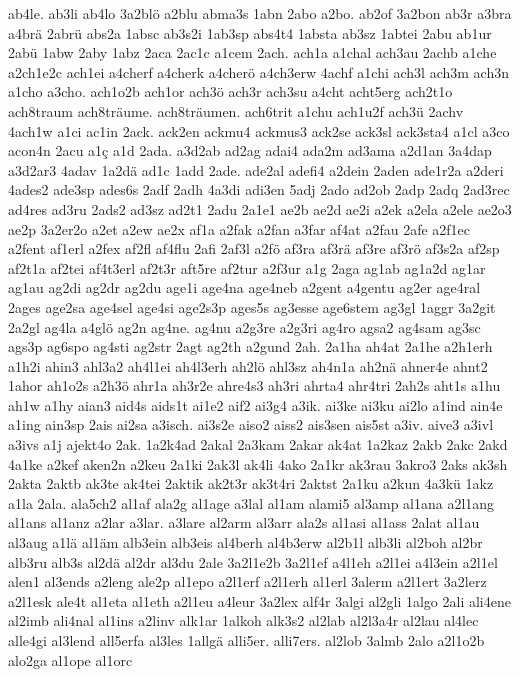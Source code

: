 {ab4le.
ab3li
ab4lo
3a2blö
a2blu
abma3s
1abn
2abo
a2bo.
ab2of
3a2bon
ab3r
a3bra
a4brä
2abrü
abs2a
1absc
ab3s2i
1ab3sp
abs4t4
1absta
ab3sz
1abtei
2abu
ab1ur
2abü
1abw
2aby
1abz
2aca
2ac1c
a1cem
2ach.
ach1a
a1chal
ach3au
2achb
a1che
a2ch1e2c
ach1ei
a4cherf
a4cherk
a4cherö
a4ch3erw
4achf
a1chi
ach3l
ach3m
ach3n
a1cho
a3cho.
ach1o2b
ach1or
ach3ö
ach3r
ach3su
a4cht
acht5erg
ach2t1o
ach8traum
ach8träume.
ach8träumen.
ach6trit
a1chu
ach1u2f
ach3ü
2achv
4ach1w
a1ci
ac1in
2ack.
ack2en
ackmu4
ackmus3
ack2se
ack3sl
ack3sta4
a1cl
a3co
acon4n
2acu
a1ç
a1d
2ada.
a3d2ab
ad2ag
adai4
ada2m
ad3ama
a2d1an
3a4dap
a3d2ar3
4adav
1a2dä
ad1c
1add
2ade.
ade2al
adefi4
a2dein
2aden
ade1r2a
a2deri
4ades2
ade3sp
ades6s
2adf
2adh
4a3di
adi3en
5adj
2ado
ad2ob
2adp
2adq
2ad3rec
ad4res
ad3ru
2ads2
ad3sz
ad2t1
2adu
2a1e1
ae2b
ae2d
ae2i
a2ek
a2ela
a2ele
ae2o3
ae2p
3a2er2o
a2et
a2ew
ae2x
af1a
a2fak
a2fan
a3far
af4at
a2fau
2afe
a2f1ec
a2fent
af1erl
a2fex
af2fl
af4flu
2afi
2af3l
a2fö
af3ra
af3rä
af3re
af3rö
af3s2a
af2sp
af2t1a
af2tei
af4t3erl
af2t3r
aft5re
af2tur
a2f3ur
a1g
2aga
ag1ab
ag1a2d
ag1ar
ag1au
ag2di
ag2dr
ag2du
age1i
age4na
age4neb
a2gent
a4gentu
ag2er
age4ral
2ages
age2sa
age4sel
age4si
age2s3p
ages5s
ag3esse
age6stem
ag3gl
1aggr
3a2git
2a2gl
ag4la
a4glö
ag2n
ag4ne.
ag4nu
a2g3re
a2g3ri
ag4ro
agsa2
ag4sam
ag3sc
ags3p
ag6spo
ag4sti
ag2str
2agt
ag2th
a2gund
2ah.
2a1ha
ah4at
2a1he
a2h1erh
a1h2i
ahin3
ahl3a2
ah4l1ei
ah4l3erh
ah2lö
ahl3sz
ah4n1a
ah2nä
ahner4e
ahnt2
1ahor
ah1o2s
a2h3ö
ahr1a
ah3r2e
ahre4s3
ah3ri
ahrta4
ahr4tri
2ah2s
aht1s
a1hu
ah1w
a1hy
aian3
aid4s
aids1t
ai1e2
aif2
ai3g4
a3ik.
ai3ke
ai3ku
ai2lo
a1ind
ain4e
a1ing
ain3sp
2ais
ai2sa
a3isch.
ai3s2e
aiso2
aiss2
ais3sen
ais5st
a3iv.
aive3
a3ivl
a3ivs
a1j
ajekt4o
2ak.
1a2k4ad
2akal
2a3kam
2akar
ak4at
1a2kaz
2akb
2akc
2akd
4a1ke
a2kef
aken2n
a2keu
2a1ki
2ak3l
ak4li
4ako
2a1kr
ak3rau
3akro3
2aks
ak3sh
2akta
2aktb
ak3te
ak4tei
2aktik
ak2t3r
ak3t4ri
2aktst
2a1ku
a2kun
4a3kü
1akz
a1la
2ala.
ala5ch2
al1af
ala2g
al1age
a3lal
al1am
alami5
al3amp
al1ana
a2l1ang
al1ans
al1anz
a2lar
a3lar.
a3lare
al2arm
al3arr
ala2s
al1asi
al1ass
2alat
al1au
al3aug
a1lä
al1äm
alb3ein
alb3eis
al4berh
al4b3erw
al2b1l
alb3li
al2boh
al2br
alb3ru
alb3s
al2dä
al2dr
al3du
2ale
3a2l1e2b
3a2l1ef
a4l1eh
a2l1ei
a4l3ein
a2l1el
alen1
al3ends
a2leng
ale2p
al1epo
a2l1erf
a2l1erh
al1erl
3alerm
a2l1ert
3a2lerz
a2l1esk
ale4t
al1eta
al1eth
a2l1eu
a4leur
3a2lex
alf4r
3algi
al2gli
1algo
2ali
ali4ene
al2imb
ali4nal
al1ins
a2linv
alk1ar
1alkoh
alk3s2
al2lab
al2l3a4r
al2lau
al4lec
alle4gi
al3lend
all5erfa
al3les
1allgä
alli5er.
alli7ers.
al2lob
3almb
2alo
a2l1o2b
alo2ga
al1ope
al1orc
}

